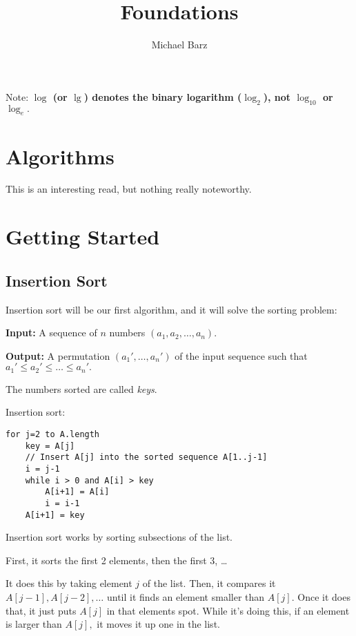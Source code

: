 \documentclass{article}
\title{Foundations}
\author{Michael Barz}
\begin{document}
\maketitle

Note: \textbf{$\log$ (or $\lg$) denotes the binary logarithm ($\log_2$), not $\log_{10}$ or $\log_e.$}

\section{Algorithms}

This is an interesting read, but nothing really noteworthy.

\section{Getting Started}

\subsection{Insertion Sort}

	Insertion sort will be our first algorithm, and it will solve the sorting problem:
\begin{tcolorbox}[title=Sorting Problem]
	\textbf{Input:} A sequence of $n$ numbers $(a_1, a_2, \dots, a_n).$

	\textbf{Output:} A permutation $(a_1', \dots, a_n')$ of the input sequence such that $a_1' \leq a_2' \leq \dots \leq a_n'.$
\end{tcolorbox}

\vspace{2mm}

The numbers sorted are called \textit{keys}.

Insertion sort:

\begin{lstlisting}
for j=2 to A.length
	key = A[j]
	// Insert A[j] into the sorted sequence A[1..j-1]
	i = j-1
	while i > 0 and A[i] > key
		A[i+1] = A[i]
		i = i-1
	A[i+1] = key
\end{lstlisting}

Insertion sort works by sorting subsections of the list.

First, it sorts the first 2 elements, then the first 3, \dots

It does this by taking element $j$ of the list. Then, it compares it $A[j-1], A[j-2], \dots$ until it finds an element smaller than $A[j].$ Once it does that, it just puts $A[j]$ in that elements spot. While it's doing this, if an element is larger than $A[j],$ it moves it up one in the list.
\end{document}
